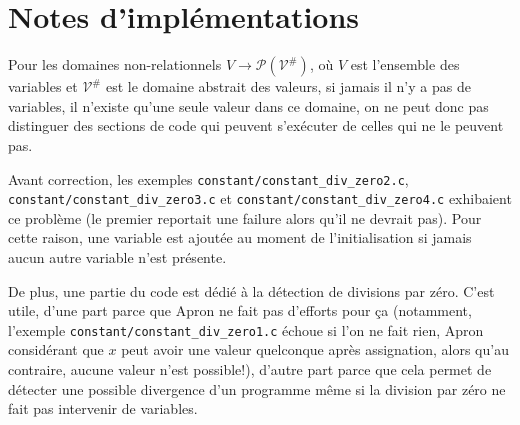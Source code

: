 \documentclass{scrartcl}
\begin{document}
\section*{Notes d'implémentations}
Pour les domaines non-relationnels \(V\to\mathcal{P(V^\#)}\), où \(V\) est l'ensemble des
variables et \(\mathcal{V}^\#\) est le domaine abstrait des valeurs, si jamais il n'y a pas de
variables, il n'existe qu'une seule valeur dans ce domaine, on ne peut donc pas distinguer des
sections de code qui peuvent s'exécuter de celles qui ne le peuvent pas.\par
Avant correction, les exemples \verb|constant/constant_div_zero2.c|, \\
\verb|constant/constant_div_zero3.c| et \verb|constant/constant_div_zero4.c| exhibaient ce
problème (le premier reportait une failure alors qu'il ne devrait pas). Pour cette raison, une
variable est ajoutée au moment de l'initialisation si jamais aucun autre variable n'est présente.\par
De plus, une partie du code est dédié à la détection de divisions par zéro. C'est utile, d'une
part parce que Apron ne fait pas d'efforts pour ça (notamment, l'exemple
\verb|constant/constant_div_zero1.c| échoue si l'on ne fait rien, Apron considérant que \(x\) peut
avoir une valeur quelconque après assignation, alors qu'au contraire, aucune valeur n'est
possible!), d'autre part parce que cela permet de détecter une possible divergence d'un programme
même si la division par zéro ne fait pas intervenir de variables.
\end{document}
